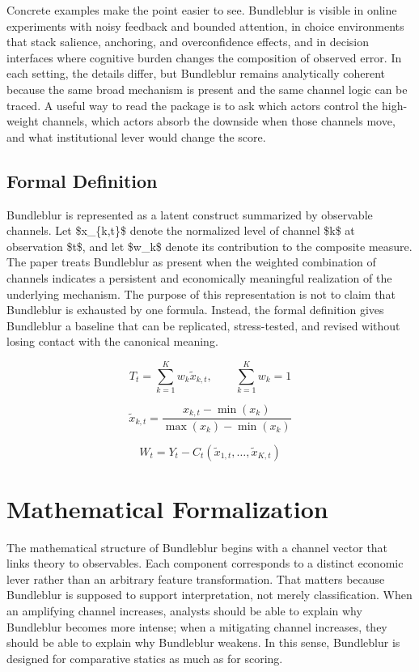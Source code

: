 \documentclass[12pt]{article}
\begin{document}
Concrete examples make the point easier to see. Bundleblur is visible in online experiments with noisy feedback and bounded attention, in choice environments that stack salience, anchoring, and overconfidence effects, and in decision interfaces where cognitive burden changes the composition of observed error. In each setting, the details differ, but Bundleblur remains analytically coherent because the same broad mechanism is present and the same channel logic can be traced. A useful way to read the package is to ask which actors control the high-weight channels, which actors absorb the downside when those channels move, and what institutional lever would change the score.

\subsection{Formal Definition}
Bundleblur is represented as a latent construct summarized by observable channels. Let \$x\_\{k,t\}\$ denote the normalized level of channel \$k\$ at observation \$t\$, and let \$w\_k\$ denote its contribution to the composite measure. The paper treats Bundleblur as present when the weighted combination of channels indicates a persistent and economically meaningful realization of the underlying mechanism. The purpose of this representation is not to claim that Bundleblur is exhausted by one formula. Instead, the formal definition gives Bundleblur a baseline that can be replicated, stress-tested, and revised without losing contact with the canonical meaning.

\begin{equation}
T_t = \sum_{k=1}^K w_k \tilde{x}_{k,t}, \qquad \sum_{k=1}^K w_k = 1
\label{eq:index}
\end{equation}

\begin{equation}
\tilde{x}_{k,t} = \frac{x_{k,t} - \min(x_k)}{\max(x_k) - \min(x_k)}
\label{eq:norm}
\end{equation}

\begin{equation}
W_t = Y_t - C_t(\tilde{x}_{1,t}, \dots, \tilde{x}_{K,t})
\label{eq:welfare}
\end{equation}

\section{Mathematical Formalization}
The mathematical structure of Bundleblur begins with a channel vector that links theory to observables. Each component corresponds to a distinct economic lever rather than an arbitrary feature transformation. That matters because Bundleblur is supposed to support interpretation, not merely classification. When an amplifying channel increases, analysts should be able to explain why Bundleblur becomes more intense; when a mitigating channel increases, they should be able to explain why Bundleblur weakens. In this sense, Bundleblur is designed for comparative statics as much as for scoring.
\end{document}
